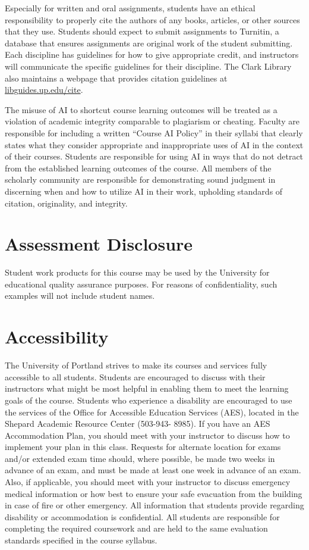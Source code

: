 \documentclass[
  letterpaper,
  DIV=11,
  numbers=noendperiod]{scrreprt}
\begin{document}
Especially for written and oral assignments, students have an ethical
responsibility to properly cite the authors of any books, articles, or
other sources that they use. Students should expect to submit
assignments to Turnitin, a database that ensures assignments are
original work of the student submitting. Each discipline has guidelines
for how to give appropriate credit, and instructors will communicate the
specific guidelines for their discipline. The Clark Library also
maintains a webpage that provides citation guidelines at
\href{https://libguides.up.edu/cite}{libguides.up.edu/cite}.

The misuse of AI to shortcut course learning outcomes will be treated as
a violation of academic integrity comparable to plagiarism or cheating.
Faculty are responsible for including a written ``Course AI Policy'' in
their syllabi that clearly states what they consider appropriate and
inappropriate uses of AI in the context of their courses. Students are
responsible for using AI in ways that do not detract from the
established learning outcomes of the course. All members of the
scholarly community are responsible for demonstrating sound judgment in
discerning when and how to utilize AI in their work, upholding standards
of citation, originality, and integrity.

\section{Assessment Disclosure}\label{assessment-disclosure}

Student work products for this course may be used by the University for
educational quality assurance purposes. For reasons of confidentiality,
such examples will not include student names.

\section{Accessibility}\label{accessibility}

The University of Portland strives to make its courses and services
fully accessible to all students. Students are encouraged to discuss
with their instructors what might be most helpful in enabling them to
meet the learning goals of the course. Students who experience a
disability are encouraged to use the services of the Office for
Accessible Education Services (AES), located in the Shepard Academic
Resource Center (503-943- 8985). If you have an AES Accommodation Plan,
you should meet with your instructor to discuss how to implement your
plan in this class. Requests for alternate location for exams and/or
extended exam time should, where possible, be made two weeks in advance
of an exam, and must be made at least one week in advance of an exam.
Also, if applicable, you should meet with your instructor to discuss
emergency medical information or how best to ensure your safe evacuation
from the building in case of fire or other emergency. All information
that students provide regarding disability or accommodation is
confidential. All students are responsible for completing the required
coursework and are held to the same evaluation standards specified in
the course syllabus.
\end{document}
